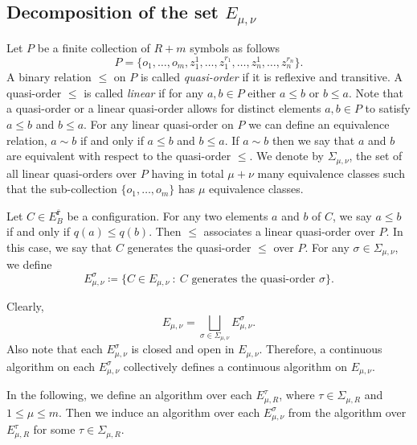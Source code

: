 \documentclass[12pt,oneside,reqno]{amsart}
\theoremstyle{plain}
\theoremstyle{definition}
\theoremstyle{remark}
\begin{document}
\subsection{Decomposition of the set \texorpdfstring{$E_{\mu, \nu}$}:}
Let $P$ be a finite collection of $R+m$ symbols as follows
\begin{equation}\label{eq symbols}
P=\big\{o_1, \ldots, o_m, z^1_{1}, \ldots , z^{r_{1}}_{1}, \ldots, z^1_{n}, \ldots , z^{r_{n}}_{n} \big\}.
\end{equation} A binary relation $\leq$ on $P$ is called \emph{quasi-order} if it is reflexive and transitive. A quasi-order $\leq$ is called \emph{linear} if for any $a, b \in P$ either $a\leq b$ or $b\leq a$. Note that a quasi-order or a linear quasi-order allows for distinct elements $a, b \in P$ to satisfy $a\leq b$ and $b\leq a$. 
For any linear quasi-order on $P$ we can define an equivalence relation, $a\sim b$ if and only if $a\leq b$ and $b\leq a$. If $a\sim b$ then we say that $a$ and $b$ are equivalent with respect to the quasi-order $\leq$. We denote by $\Sigma_{\mu, \nu}$, the set of all linear quasi-orders over $P$ having in total $\mu+\nu$ many equivalence classes such that the sub-collection $\{o_1, \ldots, o_m\}$ has $\mu$ equivalence classes.

Let $C\in E^{\bar{\textbf{r}}}_B$ be a  configuration. For any two elements $a$ and $b$ of $C$, we say $a\leq b$ if and only if $q(a)\leq q(b)$. Then $\leq$ associates a linear quasi-order over $P$. In this case, we say that $C$ generates the quasi-order $\leq$ over $P$. For any $\sigma \in \Sigma_{\mu, \nu}$, we define $$E_{\mu, \nu}^{\sigma} \coloneq \big\{ C\in E_{\mu, \nu} ~\colon~ C \text{ generates the quasi-order } \sigma\big\}.$$

\noindent Clearly, $$E_{\mu, \nu}=\bigsqcup_{\sigma \in \Sigma_{\mu, \nu}} E_{\mu, \nu}^{\sigma}.$$
Also note that each $E_{\mu, \nu}^{\sigma}$ is closed and open in $E_{\mu, \nu}$. Therefore, a continuous algorithm on each $E_{\mu,\nu}^{\sigma}$ collectively defines a continuous algorithm on $E_{\mu, \nu}$. 

In the following, we define an algorithm over each $E_{\mu,R}^{\tau}$, where $\tau \in \Sigma_{\mu,R}$ and $1\leq \mu \leq m.$ Then we induce an algorithm over each $E_{\mu,\nu}^{\sigma}$ from the algorithm over $E_{\mu,R}^{\tau}$ for some $\tau \in \Sigma_{\mu,R}$.
\end{document}
